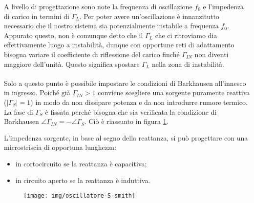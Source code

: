 
A livello di progettazione sono note la frequenza di oscillazione $f_0$ e l'impedenza di carico in termini di $\Gamma_L$. Per poter avere un'oscillazione è innanzitutto necessario che il nostro sistema sia potenzialmente instabile a frequenza $f_0$. Appurato questo, non è comunque detto che il $\Gamma_L$ che ci ritroviamo dia effettivamente luogo a instabilità, dunque con opportune reti di adattamento bisogna variare il coefficiente di riflessione del carico finché $\Gamma_{IN}$ non diventi maggiore dell'unità. Questo significa spostare $\Gamma_{L}$ nella zona di instabilità.\\ 
\\
Solo a questo punto è possibile impostare le condizioni di Barkhausen all'innesco in ingresso.
Poiché già $\Gamma_{IN}>1$ conviene scegliere una sorgente puramente reattiva ($|\Gamma_{S}|=1$) in modo da non dissipare potenza e da non introdurre rumore termico. La fase di $\Gamma_S$ è fissata perché bisogna che sia verificata la condizione di Barkhausen $\angle\Gamma_{IN} = -\angle\Gamma_S$.
Ciò è riassunto in figura \ref{fig:oscllatore-cartasmith}.

L'impedenza sorgente, in base al segno della reattanza, si può progettare con una microstriscia di opportuna lunghezza:
\begin{itemize}
	\item in cortocircuito se la reattanza è capacitiva;
	\item in circuito aperto se la reattanza è induttiva.
\end{itemize}

\begin{figure}[hbt]
	\centering
	\texttt{[image: img/oscillatore-S-smith]}
	\caption{}
	\label{fig:oscllatore-cartasmith}
\end{figure}


